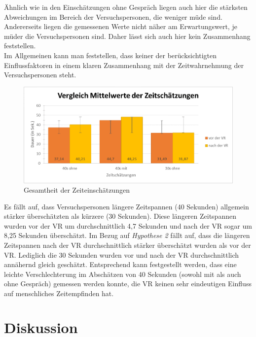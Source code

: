 \documentclass{Paper}
\begin{document}
Ähnlich wie in den Einschätzungen ohne Gespräch liegen auch hier die stärksten Abweichungen im Bereich der Versuchspersonen, die weniger müde sind. Andererseits liegen die gemessenen Werte nicht näher am Erwartungswert, je müder die Versuchspersonen sind. Daher lässt sich auch hier kein Zusammenhang feststellen.\\
Im Allgemeinen kann man feststellen, dass keiner der berücksichtigten Einflussfaktoren in einem klaren Zusammenhang mit der Zeitwahrnehmung der Versuchspersonen steht.




\begin{figure}[H]
	\centering
	\includegraphics[scale=0.7]{../Diagramme/zeitschaetzungen/vergleich.png}
	\caption{Gesamtheit der Zeiteinschätzungen}
	\label{zeiteinschaetzungen}
\end{figure}


Es fällt auf, dass Versuchspersonen längere Zeitspannen (40 Sekunden) allgemein stärker überschätzten als kürzere (30 Sekunden). Diese längeren Zeitspannen wurden vor der VR um durchschnittlich 4,7 Sekunden und nach der VR sogar um 8,25 Sekunden überschätzt.
Im Bezug auf \textit{Hypothese 2} fällt auf, dass die längeren Zeitspannen nach der VR durchschnittlich stärker überschätzt wurden als vor der VR. Lediglich die 30 Sekunden wurden vor und nach der VR durchschnittlich annähernd gleich geschätzt. Entsprechend kann festgestellt werden, dass  eine leichte Verschlechterung im Abschätzen von 40 Sekunden (sowohl mit als auch ohne Gespräch) gemessen werden konnte, die VR keinen sehr eindeutigen Einfluss auf menschliches Zeitempfinden hat.

       



\section{Diskussion}
\end{document}
